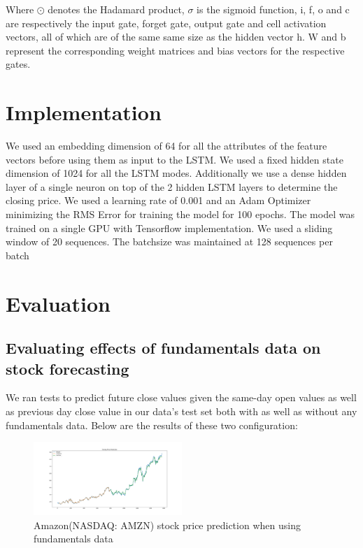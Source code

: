 \documentclass{article}
\begin{document}
Where $\odot$ denotes the Hadamard product, $\sigma$ is the sigmoid function, i, f, o and c are respectively the input gate, forget gate, output gate and cell activation vectors, all of which are of the same same size as the hidden vector h. W and b represent the corresponding weight matrices and bias vectors for the respective gates.

\section{Implementation}
\label{sec:implementation}

We used an embedding dimension of 64 for all the attributes of the feature vectors before using them as input to the LSTM. We used a fixed hidden state dimension of 1024 for all the LSTM modes. Additionally we use a dense hidden layer of a single neuron on top of the 2 hidden LSTM layers to determine the closing price. We used a learning rate of 0.001 and an Adam Optimizer minimizing the RMS Error for training the model for 100 epochs. The model was trained on a single GPU with Tensorflow implementation. We used a sliding window of 20 sequences. The batchsize was maintained at 128 sequences per batch

\section{Evaluation}
\label{sec:implementation}

\subsection{Evaluating effects of fundamentals data on stock forecasting}
\label{ssec:lstm_fundamentals_data}

We ran tests to predict future close values given the same-day open values as well as previous day close value in our data’s test set both with as well as without any fundamentals data. Below are the results of these two configuration:

\begin{figure}[h]
\centering
\includegraphics[width=0.5\textwidth]{amazon_incl_fundamentals}
\caption{Amazon(NASDAQ: AMZN) stock price prediction when using fundamentals data}
\label{fig:amazon_with_funda}
\end{figure}
\end{document}
